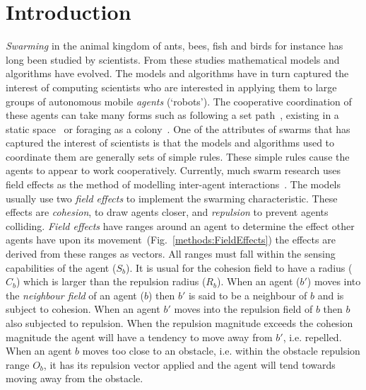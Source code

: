 \documentclass[preprint,12pt]{elsarticle}
\begin{document}

\section{Introduction}\label{sec:ConcaveReduction}
\textit{Swarming} in the animal kingdom of ants, bees, fish and birds for instance has long been studied by scientists. From these studies mathematical models and algorithms have evolved. The models and algorithms have in turn captured the interest of computing scientists who are interested in applying them to large groups of autonomous mobile \textit{agents} (`robots'). The cooperative coordination of these agents can take many forms such as following a set path~\cite{HCS:09}, existing in a static space~\cite{EP:10, GP:02, GP:04} or foraging as a colony~\cite{HER:11, GK:07}. One of the attributes of swarms that has captured the interest of scientists is that the models and algorithms used to coordinate them are generally sets of simple rules. These simple rules cause the agents to appear to work cooperatively.
Currently, much swarm research uses field effects as the method of modelling inter-agent interactions~\cite{BAF:06, BAFVM:06, BM:09, APZDAMC:09, GP:02, GP:04, GP:04a, GP:05, GP:11, MYP:09}. The models usually use two \textit{field effects} to implement the swarming characteristic. These effects are \textit{cohesion}, to draw agents closer, and \textit{repulsion} to prevent agents colliding. \textit{Field effects} have ranges around an agent to determine the effect other agents have upon its movement~(Fig.~\ref{methods:FieldEffects}) the effects are derived from these ranges as vectors. All ranges must fall within the sensing capabilities of the agent ($S_b$). It is usual for the cohesion field to have a radius ($C_b$) which is larger than the repulsion radius ($R_b$). When an agent ($b'$) moves into the \textit{neighbour field} of an agent ($b$) then $b'$ is said to be a neighbour of $b$ and is subject to cohesion. When an agent $b'$ moves into the repulsion field of $b$ then $b$ also subjected to repulsion. When the repulsion magnitude exceeds the cohesion magnitude the agent will have a tendency to move away from $b'$, i.e. repelled. When an agent $b$ moves too close to an obstacle, i.e. within the obstacle repulsion range $O_b$, it has its repulsion vector applied and the agent will tend towards moving away from the obstacle.
\end{document}
